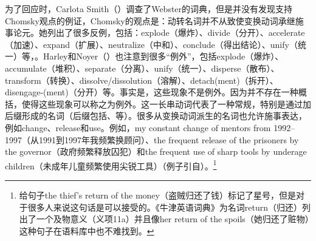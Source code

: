 \begin{exe}
\begin{xlist}[iv.]
\begin{exe}
\begin{xlist}[iv.]
为了回应时，Carlota Smith（\citeyear{Smith72a-u}）调查了Webster的词典，但是并没有发现支持Chomsky观点的例证，Chomsky的观点是：动转名词并不从致使变换动词承继施事论元。她列出了很多反例，包括：explode（爆炸）、divide（分开）、accelerate（加速）、expand（扩展）、neutralize（中和）、conclude（得出结论）、unify（统一）等，\citep[]{Smith72a-u}。Harley和Noyer（\citeyear{HN2000a}）也注意到很多“例外”，包括explode（爆炸）、accumulate（堆积）、separate（分离）、unify（统一）、disperse（散布）、transform（转换）、dissolve/dissolution（溶解）、detach(ment)（拆开）、disengage-(ment)（分开）等。事实是，这些现象不是例外。因为并不存在一种概括，使得这些现象可以称之为例外。这一长串动词代表了一种常规，特别是通过加后缀形成的名词（后缀包括、等）。很多从变换动词派生的名词也允许施事表达，例如change、release和use。例如，my constant change of mentors from 1992--1997（从1991到1997年我频繁换顾问）、the frequent release of the prisoners by the governor（政府频繁释放囚犯）和the frequent use of sharp tools by underage children（未成年儿童频繁使用尖锐工具）（例子引自\citet[fn.\,13]{Borer2003a-u}）。\footnote{\citet[, ex.~(231)]{Pesetsky96a-u}给句子the thief's return of the money（盗贼归还了钱）标记了星号，但是对于很多人来说这句话是可以接受的。《牛津英语词典》为名词return（归还）列出了一个及物意义（义项11a）并且像her return of the spoils（她归还了赃物）这种句子在语料库中也不难找到。}   


\end{xlist}
\end{exe}
\end{xlist}
\end{exe}
